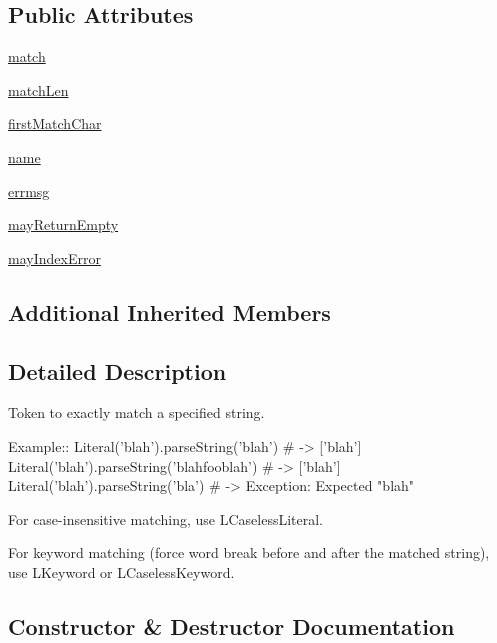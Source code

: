 \subsection*{Public Attributes}
\begin{DoxyCompactItemize}
\item 
\hyperlink{classsetuptools_1_1__vendor_1_1pyparsing_1_1Literal_a5c1178257621baaa502a28e17f59979c}{match}
\item 
\hyperlink{classsetuptools_1_1__vendor_1_1pyparsing_1_1Literal_ae287653a858bbb1dcd80d3bfe8c02e49}{match\+Len}
\item 
\hyperlink{classsetuptools_1_1__vendor_1_1pyparsing_1_1Literal_ac8770c2d843208fb9157e56795ffeb48}{first\+Match\+Char}
\item 
\hyperlink{classsetuptools_1_1__vendor_1_1pyparsing_1_1Literal_ae3a2e5191c789719d4a29f4b725a8181}{name}
\item 
\hyperlink{classsetuptools_1_1__vendor_1_1pyparsing_1_1Literal_a5559ddb4cf4d7a8b7bc54d0b0856b64d}{errmsg}
\item 
\hyperlink{classsetuptools_1_1__vendor_1_1pyparsing_1_1Literal_ad6d26490f765bf99fabcf3f3d7fbdd19}{may\+Return\+Empty}
\item 
\hyperlink{classsetuptools_1_1__vendor_1_1pyparsing_1_1Literal_aa63a44407af1029deac1e7d5ada748e3}{may\+Index\+Error}
\end{DoxyCompactItemize}
\subsection*{Additional Inherited Members}


\subsection{Detailed Description}
\begin{DoxyVerb}Token to exactly match a specified string.

Example::
    Literal('blah').parseString('blah')  # -> ['blah']
    Literal('blah').parseString('blahfooblah')  # -> ['blah']
    Literal('blah').parseString('bla')  # -> Exception: Expected "blah"

For case-insensitive matching, use L{CaselessLiteral}.

For keyword matching (force word break before and after the matched string),
use L{Keyword} or L{CaselessKeyword}.
\end{DoxyVerb}
 

\subsection{Constructor \& Destructor Documentation}
\mbox{\label{classsetuptools_1_1__vendor_1_1pyparsing_1_1Literal_a47050614e2498973e643a07c14f6029b}} 
